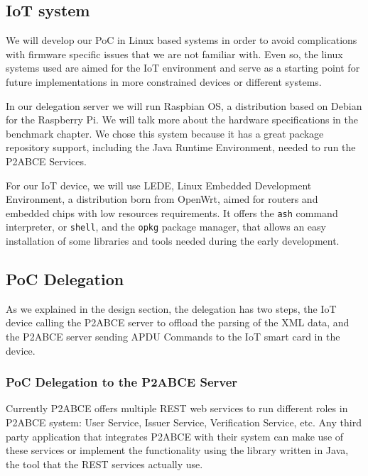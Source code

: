 \subsection{IoT system}

We will develop our PoC in Linux based systems in order to avoid complications with firmware specific issues that we are not familiar with. Even so, the linux systems used are aimed for the IoT environment and serve as a starting point for future implementations in more constrained devices or different systems.

In our delegation server we will run Raspbian OS, a distribution based on Debian for the Raspberry Pi. We will talk more about the hardware specifications in the benchmark chapter. We chose this system because it has a great package repository support, including the Java Runtime Environment, needed to run the P2ABCE Services.

For our IoT device, we will use LEDE, Linux Embedded Development Environment, a distribution born from OpenWrt, aimed for routers and embedded chips with low resources requirements. It offers the \texttt{ash} command interpreter, or \texttt{shell}, and the \texttt{opkg} package manager, that allows an easy installation of some libraries and tools needed during the early development.











\subsection{PoC Delegation}

As we explained in the design section, the delegation has two steps, the IoT device calling the P2ABCE server to offload the parsing of the XML data, and the P2ABCE server sending APDU Commands to the IoT smart card in the device.




\subsubsection{PoC Delegation to the P2ABCE Server}


Currently P2ABCE offers multiple REST web services to run different roles in P2ABCE system: User Service, Issuer Service, Verification Service, etc. Any third party application that integrates P2ABCE with their system can make use of these services or implement the functionality using the library written in Java, the tool that the REST services actually use.


